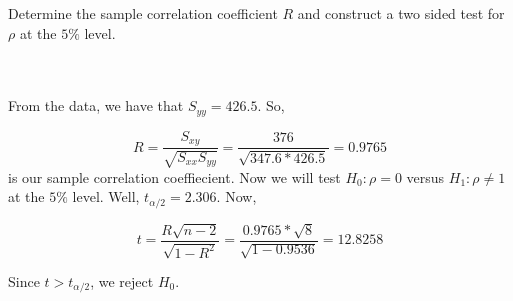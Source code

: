 Determine the sample correlation coefficient $R$ and construct a two sided test for $\rho$ at the $5\%$
level.\\\\

\begin{solution}\renewcommand{\qedsymbol}{}\ \\
    From the data, we have that $S_{yy}=426.5$. So,
    
    $$R=\frac{S_{xy}}{\sqrt{S_{xx}S_{yy}}}=\frac{376}{\sqrt{347.6*426.5}}=0.9765$$
    is our sample correlation coeffiecient. Now we will test $H_0:\rho=0$ versus $H_1:\rho\neq1$ at the
    $5\%$ level. Well, $t_{\alpha/2}=2.306$. Now,
    
    $$t=\frac{R\sqrt{n-2}}{\sqrt{1-R^2}}=\frac{0.9765*\sqrt{8}}{\sqrt{1-0.9536}}=12.8258$$
    
    Since $t>t_{\alpha/2}$, we reject $H_0$.

\end{solution}